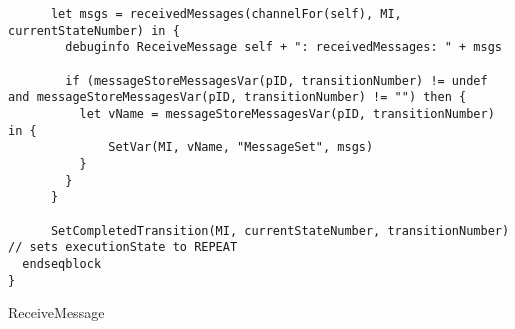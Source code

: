 \begin{listing}[H]
\begin{verbatim}
      let msgs = receivedMessages(channelFor(self), MI, currentStateNumber) in {
        debuginfo ReceiveMessage self + ": receivedMessages: " + msgs

        if (messageStoreMessagesVar(pID, transitionNumber) != undef and messageStoreMessagesVar(pID, transitionNumber) != "") then {
          let vName = messageStoreMessagesVar(pID, transitionNumber) in {
              SetVar(MI, vName, "MessageSet", msgs)
          }
        }
      }

      SetCompletedTransition(MI, currentStateNumber, transitionNumber) // sets executionState to REPEAT
  endseqblock
}
\end{verbatim}
\caption{ReceiveMessage}
\label{lst:asm:ReceiveMessage}
\end{listing}




